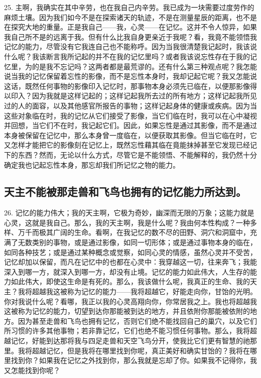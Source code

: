 25. 主啊，我确实在其中辛劳，也在我自己内辛劳。我已成为一块需要过度劳作的麻烦土壤。因为我们如今不是在探索诸天的轨迹，不是在测量星辰的距离，也不是在探究大地的重量。正是我自己——我，心灵——在记忆。这并不令人惊异，如果我自己所不是的远离于我。但有什么比我自身更亲近于我呢？看，我竟不能领悟我记忆的能力，尽管没有它我连自己也不能称呼。因为当我很清楚我记起时，我该说什么呢？我该断言我所记起的并不在我的记忆里吗？或者我该说忘性存在于我的记忆里，为的是我不忘记吗？这两者都是最荒谬的。还有什么第三种观点呢？我怎能说当我的记忆保留着忘性的影像，而不是忘性本身时，我却记起它呢？我又怎能说这话，既然任何事物的影像印入记忆时，那事物本身必须先已临在，以便那影像得以印入？因为我就是这样记起的；这样记起我所去过的所有地方；这样记起我所见过的人的面容，以及其他感官所报告的事物；这样记起身体的健康或疾病。因为当这些对象临在时，我的记忆从它们接受了影像，当它们临在时，我可以在心中凝视并回想，当它们不在时，我记起它们。因此，如果忘性是通过其影像，而不是通过本身被保留在记忆中，那么本身曾一度临在，以便获取其影像。但当它临在时，它又怎样才能把它的影像刻在记忆上，既然忘性藉其临在竟能抹掉甚至它发现已经记下的东西？然而，无论以什么方式，尽管它是不能领悟、不能解释的，我仍然十分确定我也记起忘性本身，那忘却我们所记忆之物的能力。\par


\subsection{天主不能被那走兽和飞鸟也拥有的记忆能力所达到。}

26. 记忆的能力伟大；我的天主啊，它极为奇妙，幽深而无限的万象；这能力就是心灵，这就是我自己。那么，我的天主啊，我是什么呢？我由何本性构成？一种多样、万千而极其广阔的生命。看啊，在我记忆的数不尽的田野、洞穴和洞窟中，充满了无数类别的事物，或是通过影像，如同一切形体；或是通过事物本身的临在，如同各种技艺；或是通过某种概念或觉察，如同心灵的情感，虽然心灵并不受苦，记忆却加以保留，而凡在记忆中的也都在心灵中：我穿越这一切，往来奔飞；我能深入到哪一方，就深入到哪一方，却没有止境。记忆的能力如此伟大，人生存的能力如此伟大，即使这生命是有死的。那么，我该做什么呢，我真正的生命、我的天主？我将超越我这被称为记忆的能力——我将超越它，好能走向你，甘饴的光明。你对我说什么呢？看哪，我正以我的心灵高翔向你，你常居我之上。我也将超越我这被称为记忆的能力，切望到达你那能被到达的地方，并且依附你那能被依附的地方。因为甚至走兽和飞鸟也拥有记忆，否则它们绝不能找回自己的巢穴，以及它们所习惯的许多其他事物；若非靠记忆，它们也绝不能习惯任何事物。那么，我将超越记忆，好能到达那将我与四足走兽和天空飞鸟分开，使我比它们更有智慧的祂那里。我将超越记忆，但是我将在哪里找到你呢，真正美好和确实甘饴的？我将在哪里找到你？如果我在记忆之外找到你，那么我就是忘却了你。如果我不记得你，我又怎能找到你呢？\par

